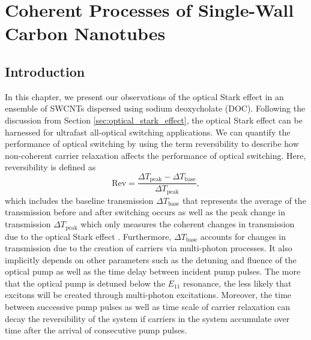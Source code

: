 \chapter{Coherent Processes of Single-Wall Carbon Nanotubes}

\section{Introduction}



In this chapter, we present our observations of the optical Stark effect in an ensemble of SWCNTs dispersed using sodium deoxycholate (DOC). Following the discussion from Section \ref{sec:optical_stark_effect}, the optical Stark effect can be harnessed for ultrafast all-optical switching applications. We can quantify the performance of optical switching by using the term reversibility to describe how non-coherent carrier relaxation affects the performance of optical switching. Here, reversibility is defined as
%
\begin{equation}
 	\text{Rev} = \dfrac{\Delta T_\text{peak} - \Delta T_\text{base}}{\Delta T_\text{peak}},
  \label{eq:kira_reversibility}
\end{equation}
%
which includes the baseline transmission $\Delta T_\text{base}$ that represents the average of the transmission before and after switching occurs as well as the peak change in transmission $\Delta T_\text{peak}$ which only measures the coherent changes in transmission due to the optical Stark effect \cite{mack2019}. Furthermore, $\Delta T_\text{base}$ accounts for changes in transmission due to the creation of carriers via multi-photon processes. It also implicitly depends on other parameters such as the detuning and fluence of the optical pump as well as the time delay between incident pump pulses. The more that the optical pump is detuned below the $E_{11}$ resonance, the less likely that excitons will be created through multi-photon excitations. Moreover, the time between successive pump pulses as well as time scale of carrier relaxation can decay the reversibility of the system if carriers in the system accumulate over time after the arrival of consecutive pump pulses.

